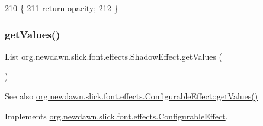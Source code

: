 \begin{DoxyCode}
210                               \{
211         \textcolor{keywordflow}{return} \mbox{\hyperlink{classorg_1_1newdawn_1_1slick_1_1font_1_1effects_1_1_shadow_effect_a6a03f4db2ffd55023ab5f9fde923dc0e}{opacity}};
212     \}
\end{DoxyCode}
\mbox{\label{classorg_1_1newdawn_1_1slick_1_1font_1_1effects_1_1_shadow_effect_ae193ed21854ee9c0b05080dcd6cc8aa2}} 
\subsubsection{\texorpdfstring{get\+Values()}{getValues()}}
{\footnotesize\ttfamily List org.\+newdawn.\+slick.\+font.\+effects.\+Shadow\+Effect.\+get\+Values (\begin{DoxyParamCaption}{ }\end{DoxyParamCaption})\hspace{0.3cm}{\ttfamily [inline]}}

\begin{DoxySeeAlso}{See also}
\mbox{\hyperlink{interfaceorg_1_1newdawn_1_1slick_1_1font_1_1effects_1_1_configurable_effect_ac4ea8fedf0f9d7ca7ffe1bd5543d78cb}{org.\+newdawn.\+slick.\+font.\+effects.\+Configurable\+Effect\+::get\+Values()}} 
\end{DoxySeeAlso}


Implements \mbox{\hyperlink{interfaceorg_1_1newdawn_1_1slick_1_1font_1_1effects_1_1_configurable_effect_ac4ea8fedf0f9d7ca7ffe1bd5543d78cb}{org.\+newdawn.\+slick.\+font.\+effects.\+Configurable\+Effect}}.


